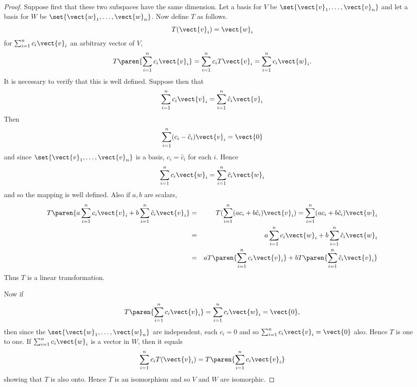 \begin{proof} Suppose first that these two subspaces have the same
dimension. Let a basis for $V$ be $\set{
\vect{v}_{1},\ldots,\vect{v}_{n}} $ and let a basis for $W$ be $
\set{\vect{w}_{1},\ldots,\vect{w}_{n}}$. Now define $T$ as
follows. 
\begin{equation*}
T(\vect{v}_{i})=\vect{w}_{i}
\end{equation*}
for $\sum_{i=1}^{n}c_{i}\vect{v}_{i}$ an arbitrary vector of $V$,
\begin{equation*}
T\paren{\sum_{i=1}^{n}c_{i}\vect{v}_{i}} = \sum_{i=1}^{n}c_{i}T
\vect{v}_{i}=\sum_{i=1}^{n}c_{i}\vect{w}_{i}.
\end{equation*}
It is necessary to verify that this is well defined. Suppose then that 
\begin{equation*}
\sum_{i=1}^{n}c_{i}\vect{v}_{i}=\sum_{i=1}^{n}\hat{c}_{i}\vect{v}_{i}
\end{equation*}
Then 
\begin{equation*}
\sum_{i=1}^{n}(c_{i}-\hat{c}_{i}) \vect{v}_{i}=\vect{0}
\end{equation*}
and since $\set{\vect{v}_{1},\ldots,\vect{v}_{n}} $ is a basis, $
c_{i}=\hat{c}_{i}$ for each $i$. Hence 
\begin{equation*}
\sum_{i=1}^{n}c_{i}\vect{w}_{i}=\sum_{i=1}^{n}\hat{c}_{i}\vect{w}_{i}
\end{equation*}
and so the mapping is well defined. Also if $a,b$ are scalars, 
\begin{eqnarray*}
T\paren{a\sum_{i=1}^{n}c_{i}\vect{v}_{i}+b\sum_{i=1}^{n}\hat{c}_{i}\vect{v}%
_{i}} &=&T(\sum_{i=1}^{n}(ac_{i}+b\hat{c}_{i}) \vect{v%
}_{i}) =\sum_{i=1}^{n}(ac_{i}+b\hat{c}_{i}) \vect{w}_{i} \\
&=&a\sum_{i=1}^{n}c_{i}\vect{w}_{i}+b\sum_{i=1}^{n}\hat{c}_{i}\vect{w}_{i} \\
&=&aT\paren{\sum_{i=1}^{n}c_{i}\vect{v}_{i}} +bT\paren{\sum_{i=1}^{n}%
\hat{c}_{i}\vect{v}_{i}}
\end{eqnarray*}
Thus $T$ is a linear transformation. 

Now if 
\begin{equation*}
T\paren{\sum_{i=1}^{n}c_{i}\vect{v}_{i}} =\sum_{i=1}^{n}c_{i}\vect{w}%
_{i}=\vect{0},
\end{equation*}
then since the $\set{\vect{w}_{1},\ldots,\vect{w}_{n}} $ are
independent, each $c_{i}=0$ and so $\sum_{i=1}^{n}c_{i}\vect{v}_{i}=\vect{0}$
also. Hence $T$ is one to one. If $\sum_{i=1}^{n}c_{i}\vect{w}_{i}$ is a
vector in $W$, then it equals 
\begin{equation*}
\sum_{i=1}^{n}c_{i}T(\vect{v}_{i})=T\paren{\sum_{i=1}^{n}c_{i}\vect{v}_{i}}
\end{equation*}
showing that $T$ is also onto. Hence $T$ is an isomorphism and so $V$ and $W$
are isomorphic.


\end{proof}
